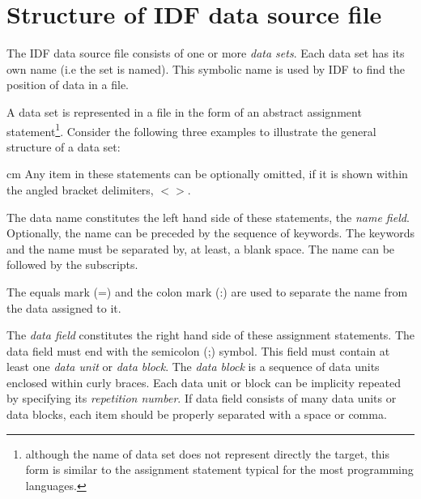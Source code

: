 \section{Structure of IDF data source file}

The IDF data source file consists of one or more {\it data sets}.
Each data set has its own name (i.e the set is named).
This symbolic name is used by IDF to find the position
of data in a file.

\newpage

A data set is represented in a file in the form of 
an abstract assignment statement\footnote{
although the name of data set does not represent directly the target, 
this form is similar to the assignment statement
typical for the most programming languages.
}.
Consider the following three examples to illustrate the
general structure of a data set:



 


{
{ cm}
Any item in these statements can be optionally omitted, 
if it is shown within the angled bracket delimiters, $<>$.
}

The data name constitutes the left hand side of these statements,
the {\it name field}.
Optionally, the name can be preceded by the sequence of keywords.
The keywords and the name must be separated by, at least, a blank space.
The name can be followed by the subscripts.
  
The equals mark (=) and the colon mark (:) are used to separate the name
from the data assigned to it. 

The {\it data field} constitutes
the right hand side of these assignment statements. 
The data field must end with the semicolon (;) symbol.
This field must contain at least one
{\it data unit} or {\it data block}.
The {\it data block} is a sequence of data units
enclosed within curly braces.
Each data unit or block can be implicity
repeated by specifying its {\it repetition number}.
If data field consists of many data units or data blocks,
each item should be properly separated with a space or comma.

